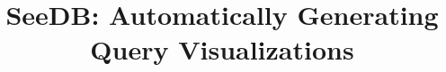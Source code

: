 \documentclass{sig-alternate}
\begin{document}
\newcommand{\agp}[1]{\textcolor{red}{Aditya: #1}}
\newcommand{\mpv}[1]{\textcolor{blue}{Manasi: #1}}
\newcommand{\SeeDB}{{\sc SeeDB}}
\newcommand{\calQ}{\mathcal{Q}}
\newcommand{\calR}{\mathcal{R}}
\newcommand{\att}[1]{{\text{#1}}}

\newtheorem{definition}{Definition}[section]
\newtheorem{example}[definition]{Example}
\newtheorem{problem}{Problem}[section]
\renewcommand{\baselinestretch}{0.995}





\newcommand{\squishlist}{
   \begin{list}{$\bullet$}
    { \setlength{\itemsep}{0pt}
      \setlength{\parsep}{2pt}
      \setlength{\topsep}{0pt}
      \setlength{\partopsep}{0pt}
      \leftmargin=25pt
\rightmargin=0pt
\labelsep=5pt
\labelwidth=10pt
\itemindent=0pt
\listparindent=0pt
\itemsep=\parsep
    }
}
\newcommand{\squishend}{\end{list}}

\newenvironment{denselist}{
    \begin{list}{\tiny{$\bullet$}}%
    {\setlength{\itemsep}{0ex} \setlength{\topsep}{0ex}
    \setlength{\parsep}{0pt} \setlength{\itemindent}{0pt}
    \setlength{\leftmargin}{0.5em}
    \setlength{\partopsep}{0pt}}}%
    {\end{list}}

\newcommand{\eat}[1]{}
\newcommand{\papertext}[1]{#1}
\newcommand{\techreport}[1]{}

\newcommand{\techreporttext}[1]{}
\newcommand{\stitle}[1]{\vspace{0.25em}\noindent\textbf{#1}}




\title{{\LARGE \sc SeeDB}: Automatically Generating Query Visualizations}
\end{document}
